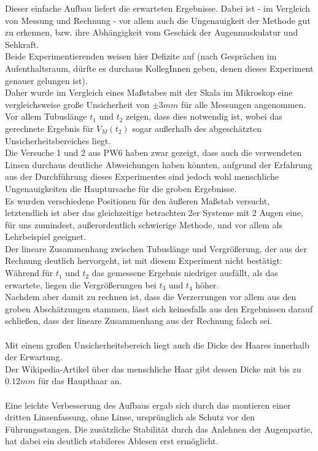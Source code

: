 \documentclass[12pt,a4paper]{article}
\begin{document}
\begin{multicols}{2}
Dieser einfache Aufbau liefert die erwarteten Ergebnisse. Dabei ist - im Vergleich von Messung und Rechnung - vor allem auch die Ungenauigkeit der Methode gut zu erkennen, bzw. ihre Abhängigkeit vom Geschick der Augenmuskulatur und Sehkraft.\\
Beide Experimentierenden weisen hier Defizite auf (nach Gesprächen im Aufenthaltsraum, dürfte es durchaus KollegInnen geben, denen dieses Experiment genauer gelungen ist).\\
Daher wurde im Vergleich eines Maßstabes mit der Skala im Mikroskop eine vergleichsweise große Unsicherheit von $\pm 3mm$ für alle Messungen angenommen. Vor allem Tubuslänge $t_1$ und $t_2$ zeigen, dass dies notwendig ist, wobei das gerechnete Ergebnis für  $V_M(t_2)$ sogar außerhalb des abgeschätzten Unsicherheitsbereiches liegt.\\
Die Versuche 1 und 2 aus PW6 haben zwar gezeigt, dass auch die verwendeten Linsen durchaus deutliche Abweichungen haben könnten, aufgrund der Erfahrung aus der Durchführung dieses Experimentes sind jedoch wohl menschliche Ungenauigkeiten die Hauptursache für die groben Ergebnisse.\\
Es wurden verschiedene Positionen für den äußeren Maßstab versucht, letztendlich ist aber das gleichzeitige betrachten 2er Systeme mit 2 Augen eine, für uns zumindest, außerordentlich schwierige Methode, und vor allem als Lehrbeispiel geeignet.\\
Der lineare Zusammenhang zwischen Tubuslänge und Vergrößerung, der aus der Rechnung deutlich hervorgeht, ist mit diesem Experiment nicht bestätigt: Während für $t_1$ und $t_2$ das gemessene Ergebnis niedriger ausfällt, als das erwartete, liegen die Vergrößerungen bei $t_3$ und $t_4$ höher.\\
Nachdem aber damit zu rechnen ist, dass die Verzerrungen vor allem aus den groben Abschätzungen stammen, lässt sich keinesfalls aus den Ergebnissen darauf schließen, dass der lineare Zusammenhang aus der Rechnung falsch sei.\\
\\
Mit einem großen Unsicherheitsbereich liegt auch die Dicke des Haares innerhalb der Erwartung.\\
Der Wikipedia-Artikel über das menschliche Haar gibt dessen Dicke mit bis zu $0.12mm$ für das Haupthaar an.\\
\\
Eine leichte Verbesserung des Aufbaus ergab sich durch das montieren einer dritten Linsenfassung, ohne Linse, ursprünglich als Schutz vor den Führungsstangen. Die zusätzliche Stabilität durch das Anlehnen der Augenpartie, hat dabei ein deutlich stabileres Ablesen erst ermöglicht.


\end{multicols}
\end{document}
